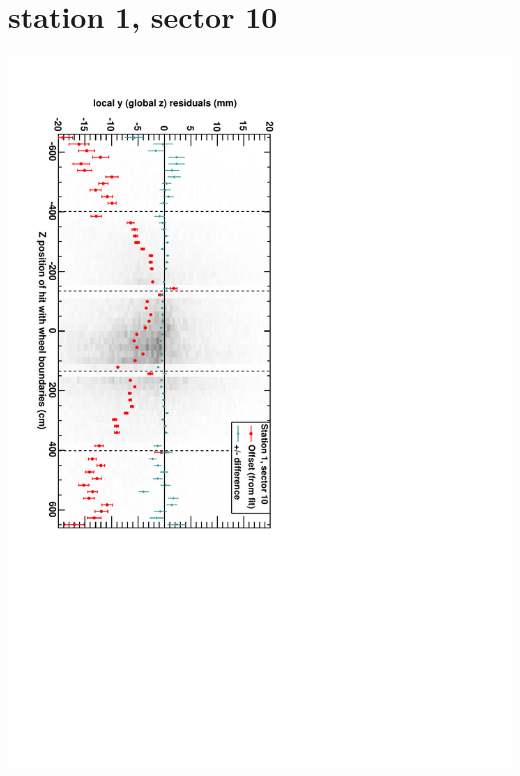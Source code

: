 \documentclass[compress]{beamer}
\begin{document}
\section*{station 1, sector 10}
\begin{frame} \vfill \mbox{\hspace{-1 cm}\includegraphics[height=1.2\linewidth, angle=90]{DTzVsZ_st1_sr10.pdf}} \end{frame}
\end{document}
